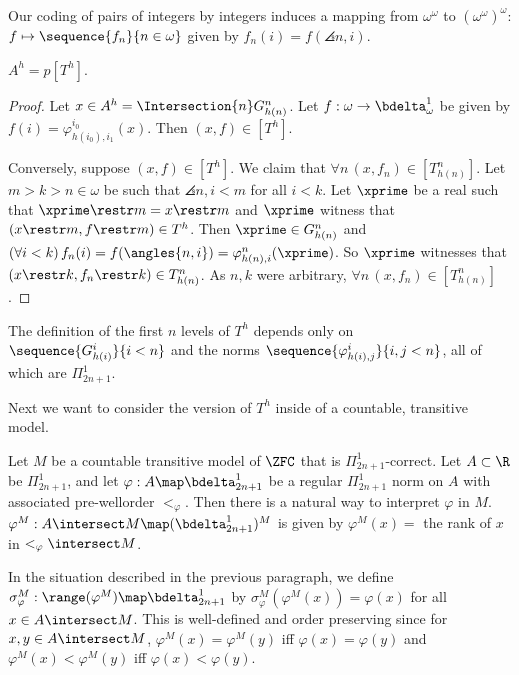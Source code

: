 \documentclass[oneside,12pt]{amsart}
\begin{document}
Our coding of pairs of integers by integers induces a mapping from $\omega^{\omega}$ to $(\omega^{\omega})^{\omega}$: 
$f\mapsto\sequence{f_n}{n\in\omega}$ given by $f_n(i) = f(\angles{n,i})$.

\begin{proposition}
$A^h = p[T^h]$.
\end{proposition}
\begin{proof}
Let $x\in A^h = \Intersection{n} G^n_{h(n)}$. Let $f:\omega\to\bdelta^1_{\omega}$
be given by $f(i)=\varphi^{i_0}_{h(i_0),i_1}(x)$. Then $(x,f)\in [T^h]$.

Conversely, suppose $(x,f)\in [T^h]$. We claim that $\forall n \, (x,f_n)\in[T^n_{h(n)}]$.
Let $m > k > n \in \omega$
be such that $\angles{n,i}<m$ for all $i<k$. Let $\xprime$ be a real
such that $\xprime\restr m = x \restr m$ and $\xprime$ witness that
$(x\restr m, f\restr m)\in T^h$. Then $\xprime\in G^n_{h(n)}$
and $(\forall i < k)\, f_n(i)=f(\angles{n,i})=\varphi^{n}_{h(n),i}(\xprime)$.
So $\xprime$ witnesses that $(x\restr k, f_n\restr k)\in T^n_{h(n)}$.
As $n,k$ were arbitrary, $\forall n \, (x,f_n)\in[T^n_{h(n)}]$.

\end{proof}


\begin{remark}
\item The definition of the first $n$ levels of $T^h$ depends only on
 $\sequence{G^i_{h(i)}}{i<n}$ and
the norms $\sequence{\varphi^i_{h(i), j}}{i,j<n}$, all of which are $\Pi^1_{2n+1}$.
\end{remark}

Next we want to consider the version of $T^h$ inside of a countable, transitive model.

Let $M$ be a countable transitive model of $\ZFC$ that is $\Pi^1_{2n+1}$-correct.
Let $A\subset\R$ be $\Pi^1_{2n+1}$, and let $\varphi:A\map\bdelta^1_{2n+1}$ be a regular
$\Pi^1_{2n+1}$ norm on $A$ with associated pre-wellorder $<_\varphi$.
Then there is a natural way to interpret $\varphi$ in $M$.
$\varphi^M:A\intersect M \map (\bdelta^1_{2n+1})^M$
is given by $\varphi^M(x) = $ the rank of $x$ in $<_\varphi \intersect M$.

\begin{definition}
In the situation described in the previous paragraph, we define
$\sigma^M_{\varphi}:\range(\varphi^M)\map\bdelta^1_{2n+1}$ by
$\sigma^M_{\varphi}(\varphi^M(x))=\varphi(x)$ for all $x\in A \intersect M$.
This is well-defined and order preserving since for $x,y\in A\intersect M$,
$\varphi^M(x)=\varphi^M(y)$ iff $\varphi(x)=\varphi(y)$ and
$\varphi^M(x)<\varphi^M(y)$ iff $\varphi(x)<\varphi(y)$.
\end{definition}
\end{document}
